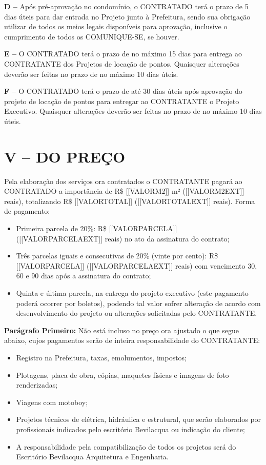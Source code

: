 \documentclass[11pt,a4paper]{article}
\begin{document}
\noindent\textbf{D –} Após pré-aprovação no condomínio, o CONTRATADO terá o prazo de 5 dias úteis para dar entrada no Projeto junto à Prefeitura, sendo sua obrigação utilizar de todos os meios legais disponíveis para aprovação, inclusive o cumprimento de todos os COMUNIQUE-SE, se houver.

\noindent\textbf{E –} O CONTRATADO terá o prazo de no máximo 15 dias para entrega ao CONTRATANTE dos Projetos de locação de pontos. Quaisquer alterações deverão ser feitas no prazo de no máximo 10 dias úteis.

\noindent\textbf{F –} O CONTRATADO terá o prazo de até 30 dias úteis após aprovação do projeto de locação de pontos para entregar ao CONTRATANTE o Projeto Executivo. Quaisquer alterações deverão ser feitas no prazo de no máximo 10 dias úteis.

\section*{V – DO PREÇO}
Pela elaboração dos serviços ora contratados o CONTRATANTE pagará ao CONTRATADO a importância de R\$ [[VALORM2]] m² ([[VALORM2EXT]] reais), totalizando R\$ [[VALORTOTAL]] ([[VALORTOTALEXT]] reais). Forma de pagamento:
\begin{itemize}
    \item Primeira parcela de 20\%: R\$ [[VALORPARCELA]] ([[VALORPARCELAEXT]] reais) no ato da assinatura do contrato;
    \item Três parcelas iguais e consecutivas de 20\% (vinte por cento): R\$ [[VALORPARCELA]] ([[VALORPARCELAEXT]] reais) com vencimento 30, 60 e 90 dias após a assinatura do contrato;
    \item Quinta e última parcela, na entrega do projeto executivo (este pagamento poderá ocorrer por boletos), podendo tal valor sofrer alteração de acordo com desenvolvimento do projeto ou alterações solicitadas pelo CONTRATANTE.
\end{itemize}

\noindent\textbf{Parágrafo Primeiro:} Não está incluso no preço ora ajustado o que segue abaixo, cujos pagamentos serão de inteira responsabilidade do CONTRATANTE:
\begin{itemize}
    \item Registro na Prefeitura, taxas, emolumentos, impostos;
    \item Plotagens, placa de obra, cópias, maquetes físicas e imagens de foto renderizadas;
    \item Viagens com motoboy;
    \item Projetos técnicos de elétrica, hidráulica e estrutural, que serão elaborados por profissionais indicados pelo escritório Bevilacqua ou indicação do cliente;
    \item A responsabilidade pela compatibilização de todos os projetos será do Escritório Bevilacqua Arquitetura e Engenharia.
\end{itemize}
\end{document}
